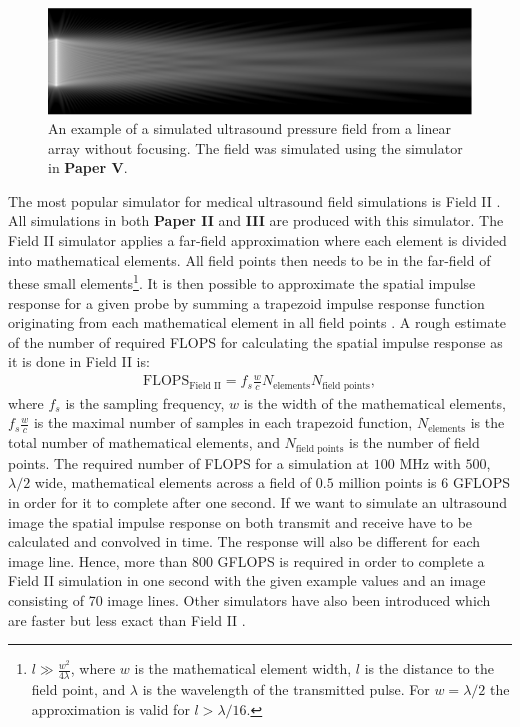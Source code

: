\begin{figure}[t!]
\centering
\includegraphics[width=\textwidth]{img/hos.eps}
\caption{An example of a simulated ultrasound pressure field from a linear array without focusing. The field was simulated using the simulator in \textbf{Paper V}.}
\label{fig:hos}
\end{figure}

The most popular simulator for medical ultrasound field simulations is Field II \cite{Jensen1992}. All simulations in both \textbf{Paper II} and \textbf{III} are produced with this simulator. The Field II simulator applies a far-field approximation where each element is divided into mathematical elements. All field points then needs to be in the far-field of these small elements\footnote{$l\gg\frac{w^2}{4\lambda}$, where $w$ is the mathematical element width, $l$ is the distance to the field point, and $\lambda$ is the wavelength of the transmitted pulse. For $w=\lambda/2$ the approximation is valid for $l>\lambda/16$.}. It is then possible to approximate the spatial impulse response for a given probe by summing a trapezoid impulse response function originating from each mathematical element in all field points \cite{Jensen1992}. A rough estimate of the number of required FLOPS for calculating the spatial impulse response as it is done in Field II is:
\begin{align}
\text{FLOPS}_\text{Field II} = f_s\frac{w}{c}N_{\text{elements}}N_{\text{field points}},
\end{align}
where $f_s$ is the sampling frequency, $w$ is the width of the mathematical elements, $f_s\frac{w}{c}$ is the maximal number of samples in each trapezoid function, $N_{\text{elements}}$ is the total number of mathematical elements, and $N_{\text{field points}}$ is the number of field points. The required number of FLOPS for a simulation at $100$ MHz with $500$, $\lambda/2$ wide, mathematical elements across a field of $0.5$ million points is $6$ GFLOPS in order for it to complete after one second. If we want to simulate an ultrasound image the spatial impulse response on both transmit and receive have to be calculated and convolved in time. The response will also be different for each image line. Hence, more than 800 GFLOPS is required in order to complete a Field II simulation in one second with the given example values and an image consisting of 70 image lines. %
Other simulators have also been introduced which are faster but less exact than Field II \cite{Hergum2009}.

